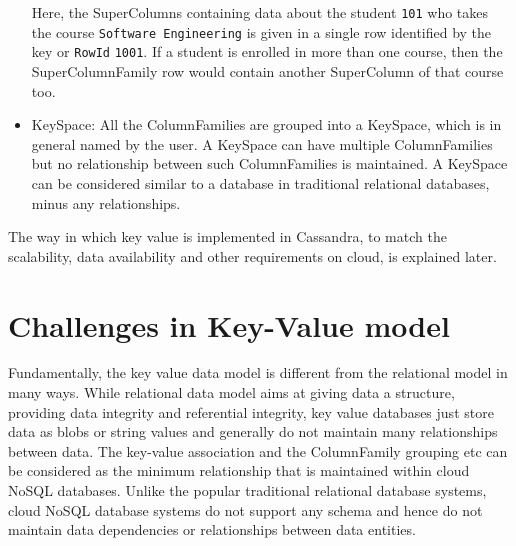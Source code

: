 \begin{itemize}
Here, the SuperColumns containing data about the student \texttt{101} who
takes the course \texttt{Software  Engineering} is given in a single row identified by
the key or \texttt{RowId} \texttt{1001}. If a student is enrolled in more than
one course, then the SuperColumnFamily row would contain another SuperColumn of that course too.

\item  KeySpace: All the ColumnFamilies are grouped into a KeySpace, which is in
general named by the user. A KeySpace can have multiple ColumnFamilies but no
relationship between such ColumnFamilies is maintained. A KeySpace can be
considered similar to a database in traditional relational databases, minus any
relationships.

\end{itemize}
The way in which key value is implemented in Cassandra, to match the
scalability, data availability and other requirements on cloud, is explained
later.


\section{Challenges in Key-Value model}\label{s:challenges-key-value}
Fundamentally, the key value data model is different from the relational model
in many ways. While relational data model aims at giving data a structure,
providing data integrity and referential integrity, key value databases just
store data as blobs or string values and generally do not maintain many
relationships between data. The key-value association and the ColumnFamily
grouping etc can be considered as the minimum relationship that is maintained
within cloud \ac{NoSQL} databases. Unlike the popular traditional relational
database systems, cloud \ac{NoSQL} database systems do not support any schema
and hence do not maintain data dependencies or relationships between data entities.


